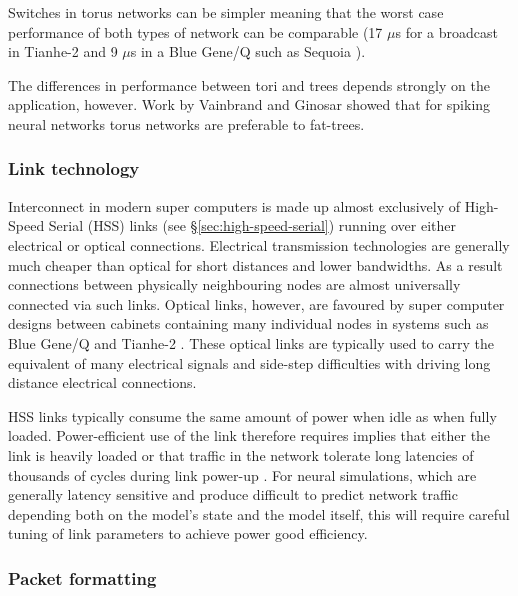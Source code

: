 				Switches in torus networks can be simpler meaning that the worst case
				performance of both types of network can be comparable (17 $\mu$s for a
				broadcast in Tianhe-2 and 9 $\mu$s in a Blue Gene/Q such as Sequoia
				\cite{dongarra13,morozov12}).
				
				The differences in performance between tori and trees depends strongly
				on the application, however. Work by Vainbrand and Ginosar
				\cite{vainbrand11} showed that for spiking neural networks torus
				networks are preferable to fat-trees.
			
			\subsubsection{Link technology}
				
				Interconnect in modern super computers is made up almost exclusively of
				High-Speed Serial (HSS) links (see \S\ref{sec:high-speed-serial}) running
				over either electrical or optical connections. Electrical transmission
				technologies are generally much cheaper than optical for short distances
				and lower bandwidths. As a result connections between physically
				neighbouring nodes are almost universally connected via such links.
				Optical links, however, are favoured by super computer designs between
				cabinets containing many individual nodes in systems such as Blue Gene/Q
				and Tianhe-2 \cite{dongarra13,prickett10}.  These optical links are
				typically used to carry the equivalent of many electrical signals and
				side-step difficulties with driving long distance electrical
				connections.
				
				HSS links typically consume the same amount of power when idle as when
				fully loaded.  Power-efficient use of the link therefore requires
				implies that either the link is heavily loaded or that traffic in the
				network tolerate long latencies of thousands of cycles during link
				power-up \cite{soteriou03}.  For neural simulations, which are generally
				latency sensitive and produce difficult to predict network traffic
				depending both on the model's state and the model itself, this will
				require careful tuning of link parameters to achieve power good
				efficiency.
				
			
			\subsubsection{Packet formatting}
				
